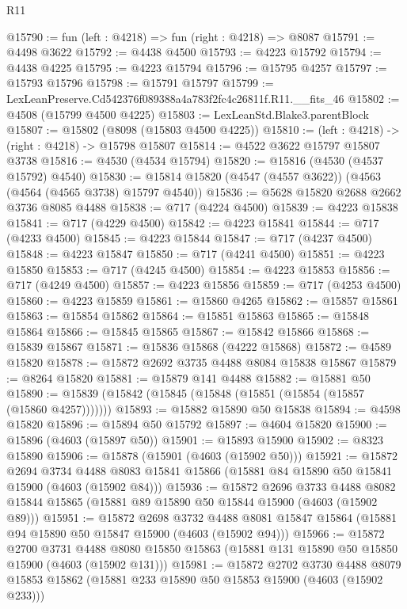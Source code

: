 \begin{lexlean}{R11}
\begin{coremodule}
@15790 := fun (left : @4218) => fun (right : @4218) => @8087
@15791 := @4498 @3622
@15792 := @4438 @4500
@15793 := @4223 @15792
@15794 := @4438 @4225
@15795 := @4223 @15794
@15796 := @15795 @4257
@15797 := @15793 @15796
@15798 := @15791 @15797
@15799 := LexLeanPreserve.Cd542376f089388a4a783f2fc4c26811f.R11.__fits_46
@15802 := @4508 (@15799 @4500 @4225)
@15803 := LexLeanStd.Blake3.parentBlock
@15807 := @15802 (@8098 (@15803 @4500 @4225))
@15810 := (left : @4218) -> (right : @4218) -> @15798 @15807
@15814 := @4522 @3622 @15797 @15807 @3738
@15816 := @4530 (@4534 @15794)
@15820 := @15816 (@4530 (@4537 @15792) @4540)
@15830 := @15814 @15820 (@4547 (@4557 @3622)) (@4563 (@4564 (@4565 @3738) @15797 @4540))
@15836 := @5628 @15820 @2688 @2662 @3736 @8085 @4488
@15838 := @717 (@4224 @4500)
@15839 := @4223 @15838
@15841 := @717 (@4229 @4500)
@15842 := @4223 @15841
@15844 := @717 (@4233 @4500)
@15845 := @4223 @15844
@15847 := @717 (@4237 @4500)
@15848 := @4223 @15847
@15850 := @717 (@4241 @4500)
@15851 := @4223 @15850
@15853 := @717 (@4245 @4500)
@15854 := @4223 @15853
@15856 := @717 (@4249 @4500)
@15857 := @4223 @15856
@15859 := @717 (@4253 @4500)
@15860 := @4223 @15859
@15861 := @15860 @4265
@15862 := @15857 @15861
@15863 := @15854 @15862
@15864 := @15851 @15863
@15865 := @15848 @15864
@15866 := @15845 @15865
@15867 := @15842 @15866
@15868 := @15839 @15867
@15871 := @15836 @15868 (@4222 @15868)
@15872 := @4589 @15820
@15878 := @15872 @2692 @3735 @4488 @8084 @15838 @15867
@15879 := @8264 @15820
@15881 := @15879 @141 @4488
@15882 := @15881 @50
@15890 := @15839 (@15842 (@15845 (@15848 (@15851 (@15854 (@15857 (@15860 @4257)))))))
@15893 := @15882 @15890 @50 @15838
@15894 := @4598 @15820
@15896 := @15894 @50 @15792
@15897 := @4604 @15820
@15900 := @15896 (@4603 (@15897 @50))
@15901 := @15893 @15900
@15902 := @8323 @15890
@15906 := @15878 (@15901 (@4603 (@15902 @50)))
@15921 := @15872
    @2694
    @3734
    @4488
    @8083
    @15841
    @15866
    (@15881 @84 @15890 @50 @15841 @15900 (@4603 (@15902 @84)))
@15936 := @15872
    @2696
    @3733
    @4488
    @8082
    @15844
    @15865
    (@15881 @89 @15890 @50 @15844 @15900 (@4603 (@15902 @89)))
@15951 := @15872
    @2698
    @3732
    @4488
    @8081
    @15847
    @15864
    (@15881 @94 @15890 @50 @15847 @15900 (@4603 (@15902 @94)))
@15966 := @15872
    @2700
    @3731
    @4488
    @8080
    @15850
    @15863
    (@15881 @131 @15890 @50 @15850 @15900 (@4603 (@15902 @131)))
@15981 := @15872
    @2702
    @3730
    @4488
    @8079
    @15853
    @15862
    (@15881 @233 @15890 @50 @15853 @15900 (@4603 (@15902 @233)))

\end{coremodule}
\end{lexlean}
